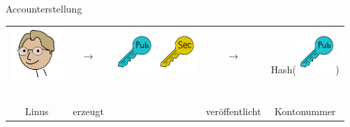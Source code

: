 \documentclass[aspectratio=169]{beamer}
\begin{document}
\begin{frame}{Accounterstellung}
    \begin{center}
        \begin{tabular}{ccccc}
            \includegraphics[width=2cm]{../icons/Linus} & {\Huge$\longrightarrow$} & \includegraphics[width=1.5cm]{../icons/PubKey} \hspace*{-0.5cm} \includegraphics[width=1.5cm]{../icons/SecKey} & {\Huge$\longrightarrow$} & {\Huge Hash(\includegraphics[width=1.5cm]{../icons/PubKey})}\\~\\
            Linus & erzeugt & & veröffentlicht & Kontonummer\\
        \end{tabular}
    \end{center}
\end{frame}
\end{document}
